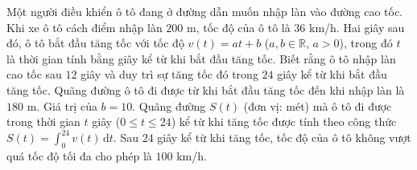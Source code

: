 \begin{ex}
Một người điều khiển ô tô đang ở đường dẫn muốn nhập làn vào đường cao tốc. Khi xe ô tô cách điểm nhập làn $200$ m, tốc độ của ô tô là $36$ km/h. Hai giây sau đó, ô tô bắt đầu tăng tốc với tốc độ $v(t)=at+b$ ($a,b\in\mathbb R$, $a>0$), trong đó $t$ là thời gian tính bằng giây kể từ khi bắt đầu tăng tốc. Biết rằng ô tô nhập làn cao tốc sau $12$ giây và duy trì sự tăng tốc đó trong $24$ giây kể từ khi bắt đầu tăng tốc.
\choiceTF
{\True Quãng đường ô tô đi được từ khi bắt đầu tăng tốc đến khi nhập làn là $180$ m.}
{\True Giá trị của $b=10$.}
{Quãng đường $S(t)$ (đơn vị: mét) mà ô tô đi được trong thời gian $t$ giây ($0\le t\le24$) kể từ khi tăng tốc được tính theo công thức $S(t)=\displaystyle\int_0^{24}v(t)\,\mathrm dt$.}
{Sau $24$ giây kể từ khi tăng tốc, tốc độ của ô tô không vượt quá tốc độ tối đa cho phép là $100$ km/h.}
\end{ex}
